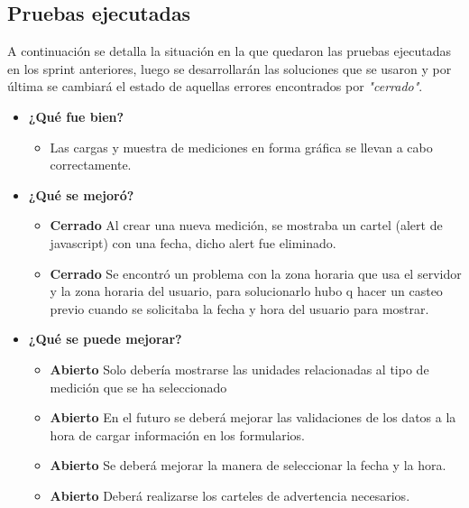 \subsection{Pruebas ejecutadas}
A continuación se detalla la situación en la que quedaron las pruebas ejecutadas en los sprint anteriores, luego se desarrollarán las soluciones que se usaron y por última se cambiará el estado de aquellas errores encontrados por \textit{"cerrado"}.
	\begin{itemize}
		\item \textbf{¿Qué fue bien?}
        	\begin{itemize}
				\item        Las cargas y muestra de mediciones en forma gráfica se llevan a cabo correctamente.
			\end{itemize}

   		\item \textbf{¿Qué se mejoró?}
        	\begin{itemize}
				\item \textbf{Cerrado} Al crear una nueva medición, se mostraba un cartel (alert de javascript) con una fecha, dicho alert fue eliminado.
                \item \textbf{Cerrado} Se encontró un problema con la zona horaria que usa el servidor y la zona horaria del usuario, para solucionarlo hubo q hacer un casteo previo cuando se solicitaba la fecha y hora del usuario para mostrar.
			\end{itemize}

   		\item \textbf{¿Qué se puede mejorar?}
        	\begin{itemize}
		        \item \textbf{Abierto} Solo debería mostrarse las unidades relacionadas al tipo de medición que se ha seleccionado 
				\item \textbf{Abierto} En el futuro se deberá mejorar las validaciones de los datos a la hora de cargar información en los formularios.
        		\item \textbf{Abierto} Se deberá mejorar la manera de seleccionar la fecha y la hora. 
                \item \textbf{Abierto} Deberá realizarse los carteles de advertencia necesarios.
            \end{itemize}
       
	\end{itemize}



